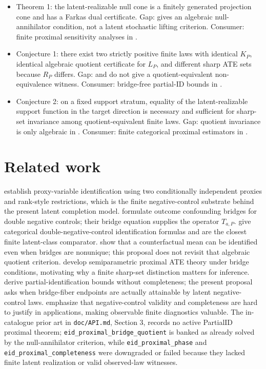 \documentclass[11pt]{article}
\theoremstyle{definition}
\theoremstyle{plain}
\theoremstyle{remark}
\begin{document}
\begin{itemize}[leftmargin=*]
\item Theorem 1: the latent-realizable null cone is a finitely generated projection cone and has a Farkas dual certificate. Gap: \citet{zhang2023proximalNonunique} gives an algebraic null-annihilator condition, not a latent stochastic lifting criterion. Consumer: finite proximal sensitivity analyses in \citet{zivich2023introducingPCI}.
\item Conjecture 1: there exist two strictly positive finite laws with identical \(K_P\), identical algebraic quotient certificate for \(L_P\), and different sharp ATE sets because \(R_P\) differs. Gap: \citet{zhang2023proximalNonunique} and \citet{shi2020multiplyRobustDNC} do not give a quotient-equivalent non-equivalence witness. Consumer: bridge-free partial-ID bounds in \citet{ghassami2023partialProxy}.
\item Conjecture 2: on a fixed support stratum, equality of the latent-realizable support function in the target direction is necessary and sufficient for sharp-set invariance among quotient-equivalent finite laws. Gap: quotient invariance is only algebraic in \citet{zhang2023proximalNonunique}. Consumer: finite categorical proximal estimators in \citet{shi2020multiplyRobustDNC}.
\end{itemize}

\section{Related work}
\citet{miao2018proxyVariables} establish proxy-variable identification using two conditionally independent proxies and rank-style restrictions, which is the finite negative-control substrate behind the present latent completion model. \citet{miao2018confoundingBridge} formulate outcome confounding bridges for double negative controls; their bridge equation supplies the operator \(T_{a,P}\). \citet{shi2020multiplyRobustDNC} give categorical double-negative-control identification formulas and are the closest finite latent-class comparator. \citet{zhang2023proximalNonunique} show that a counterfactual mean can be identified even when bridges are nonunique; this proposal does not revisit that algebraic quotient criterion. \citet{cui2024semiparametricProximal} develop semiparametric proximal ATE theory under bridge conditions, motivating why a finite sharp-set distinction matters for inference. \citet{ghassami2023partialProxy} derive partial-identification bounds without completeness; the present proposal asks when bridge-fiber endpoints are actually attainable by latent negative-control laws. \citet{zivich2023introducingPCI} emphasize that negative-control validity and completeness are hard to justify in applications, making observable finite diagnostics valuable. The in-catalogue prior art in \texttt{doc/API.md}, Section 3, records no active PartialID proximal theorem; \texttt{eid\_proximal\_bridge\_quotient} is banked as already solved by the null-annihilator criterion, while \texttt{eid\_proximal\_phase} and \texttt{eid\_proximal\_completeness} were downgraded or failed because they lacked finite latent realization or valid observed-law witnesses.
\end{document}
